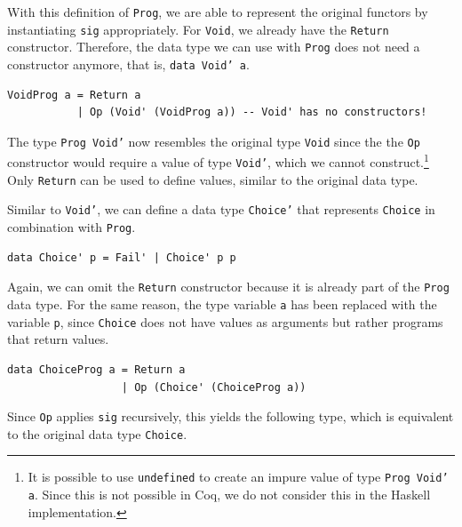 \documentclass[a4paper, 11pt, fleqn, twoside]{scrreprt}
\begin{document}
With this definition of \texttt{Prog}, we are able to represent 
the original functors by instantiating \texttt{sig} appropriately. 
For \texttt{Void}, we already have the 
\texttt{Return} constructor. Therefore, the data type we can use 
with \texttt{Prog} does not need a constructor anymore, that is, 
\texttt{data Void' a}. 

\begin{verbatim}
VoidProg a = Return a
           | Op (Void' (VoidProg a)) -- Void' has no constructors!
\end{verbatim}

The type \texttt{Prog Void'} now resembles the original type 
\texttt{Void} since the the \texttt{Op} constructor 
would require a value of type \texttt{Void'}, which we cannot 
construct.\footnote{It is possible to use \texttt{undefined} to 
create an impure value of type \texttt{Prog Void' a}. Since this 
is not possible in Coq, we do not consider this in the Haskell implementation.}
Only \texttt{Return} can be used to define values, similar to the 
original data type.

Similar to \texttt{Void'}, we can define a data type 
\texttt{Choice'} that represents \texttt{Choice} in 
combination with \texttt{Prog}. 

\begin{verbatim}
data Choice' p = Fail' | Choice' p p
\end{verbatim}

Again, we can omit the \texttt{Return} constructor because it is 
already part of the \texttt{Prog} data type. For the same reason, 
the type variable \texttt{a} has been replaced with the variable 
\texttt{p}, since \texttt{Choice} does not have 
values as arguments but rather programs that return values.

\begin{verbatim}
data ChoiceProg a = Return a
                  | Op (Choice' (ChoiceProg a))
\end{verbatim}

Since \texttt{Op} applies \texttt{sig} recursively, 
this yields the following type, which is equivalent to the original data type 
\texttt{Choice}.
\end{document}

